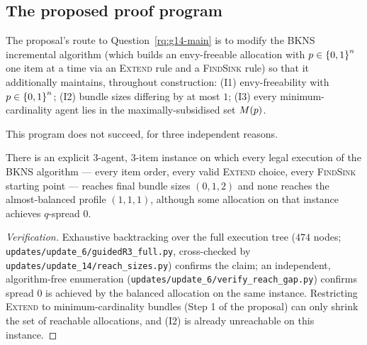 \subsection{The proposed proof program}
\label{sec:g14-program}

The proposal's route to Question~\ref{rq:g14-main} is to modify the BKNS
incremental algorithm (which builds an envy-freeable allocation with
$p\in\left\{0,1\right\}^n$ one item at a time via an \textsc{Extend} rule and a
\textsc{FindSink} rule) so that it additionally maintains, throughout
construction: (I1) envy-freeability with $p\in\left\{0,1\right\}^n$;
(I2) bundle sizes differing by at most $1$; (I3) every minimum-cardinality
agent lies in the maximally-subsidised set $M(p)$.

This program does not succeed, for three independent reasons.

\begin{proposition}
\label{prop:g14-reach}
There is an explicit $3$-agent, $3$-item instance on which every legal
execution of the BKNS algorithm --- every item order, every valid
\textsc{Extend} choice, every \textsc{FindSink} starting point --- reaches
final bundle sizes $(0,1,2)$ and none reaches the almost-balanced profile
$(1,1,1)$, although some allocation on that instance achieves $q$-spread
$0$.
\end{proposition}
\begin{proof}[Verification]
Exhaustive backtracking over the full execution tree ($474$ nodes;
\texttt{updates/update\_6/guidedR3\_full.py}, cross-checked by
\texttt{updates/update\_14/reach\_sizes.py}) confirms the claim; an independent,
algorithm-free enumeration (\texttt{updates/update\_6/verify\_reach\_gap.py})
confirms spread $0$ is achieved by the balanced allocation on the same
instance. Restricting \textsc{Extend} to minimum-cardinality bundles (Step 1
of the proposal) can only shrink the set of reachable allocations, and
(I2) is already unreachable on this instance.
\end{proof}

